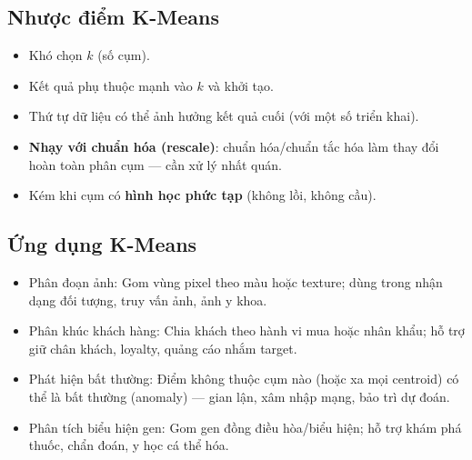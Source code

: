 \subsection{Nhược điểm K-Means}

\begin{luuy}[title={Hạn chế}]
\begin{itemize}
  \item Khó chọn $k$ (số cụm).
  \item Kết quả phụ thuộc mạnh vào $k$ và khởi tạo.
  \item Thứ tự dữ liệu có thể ảnh hưởng kết quả cuối (với một số triển khai).
  \item \textbf{Nhạy với chuẩn hóa (rescale)}: chuẩn hóa/chuẩn tắc hóa làm thay đổi hoàn toàn phân cụm --- cần xử lý nhất quán.
  \item Kém khi cụm có \textbf{hình học phức tạp} (không lồi, không cầu).
\end{itemize}
\end{luuy}

\subsection{Ứng dụng K-Means}

\begin{ynghia}[title={Ứng dụng K-Means}]
  \begin{itemize}
    \item Phân đoạn ảnh: Gom vùng pixel theo màu hoặc texture; dùng trong nhận dạng đối tượng, truy vấn ảnh, ảnh y khoa.
    \item Phân khúc khách hàng: Chia khách theo hành vi mua hoặc nhân khẩu; hỗ trợ giữ chân khách, loyalty, quảng cáo nhắm target.
    \item Phát hiện bất thường: Điểm không thuộc cụm nào (hoặc xa mọi centroid) có thể là bất thường (anomaly) --- gian lận, xâm nhập mạng, bảo trì dự đoán.
    \item Phân tích biểu hiện gen: Gom gen đồng điều hòa/biểu hiện; hỗ trợ khám phá thuốc, chẩn đoán, y học cá thể hóa.
  \end{itemize}
\end{ynghia}
